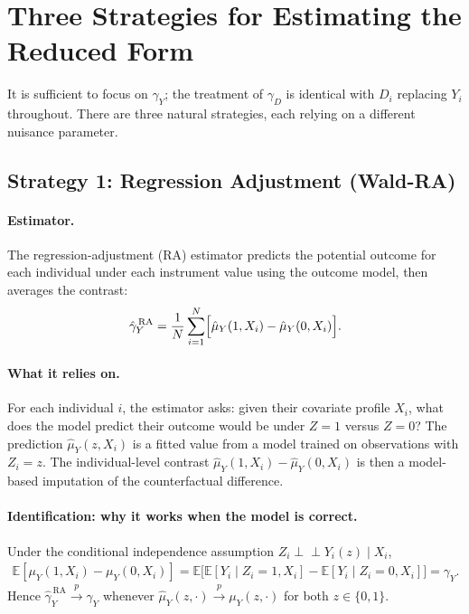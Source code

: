 \documentclass[12pt,a4paper]{article}
\theoremstyle{remark}
\newcommand{\E}{\mathbb{E}}
\newcommand{\muY}{\mu_Y}
\newcommand{\muYhat}{\hat{\mu}_Y}
\begin{document}
\section{Three Strategies for Estimating the Reduced Form}
\label{sec:three_strategies}

It is sufficient to focus on $\gamma_Y$; the treatment of $\gamma_D$ is identical
with $D_i$ replacing $Y_i$ throughout. There are three natural strategies, each
relying on a different nuisance parameter.

\subsection{Strategy 1: Regression Adjustment (Wald-RA)}
\label{subsec:ra}

\paragraph{Estimator.}
The regression-adjustment (RA) estimator predicts the potential outcome for each
individual under each instrument value using the outcome model, then averages the
contrast:
\begin{align}
  \hat{\gamma}_Y^{\,\mathrm{RA}}
  = \frac{1}{N} \sum_{i=1}^{N}
    \Bigl[\muYhat(1, X_i) - \muYhat(0, X_i)\Bigr].
  \label{eq:ra_estimator}
\end{align}

\paragraph{What it relies on.}
For each individual $i$, the estimator asks: given their covariate profile $X_i$, what
does the model predict their outcome would be under $Z=1$ versus $Z=0$? The prediction
$\muYhat(z, X_i)$ is a fitted value from a model trained on observations with $Z_i = z$.
The individual-level contrast $\muYhat(1,X_i) - \muYhat(0,X_i)$ is then a model-based
imputation of the counterfactual difference.

\paragraph{Identification: why it works when the model is correct.}
Under the conditional independence assumption $Z_i \perp\!\!\!\perp Y_i(z) \mid X_i$,
\begin{align}
  \E[\muY(1, X_i) - \muY(0, X_i)]
  = \E\bigl[\E[Y_i \mid Z_i=1, X_i] - \E[Y_i \mid Z_i=0, X_i]\bigr]
  = \gamma_Y.
  \label{eq:ra_id}
\end{align}
Hence $\hat{\gamma}_Y^{\,\mathrm{RA}} \xrightarrow{p} \gamma_Y$ whenever
$\muYhat(z,\cdot) \xrightarrow{p} \muY(z,\cdot)$ for both $z \in \{0,1\}$.
\end{document}
